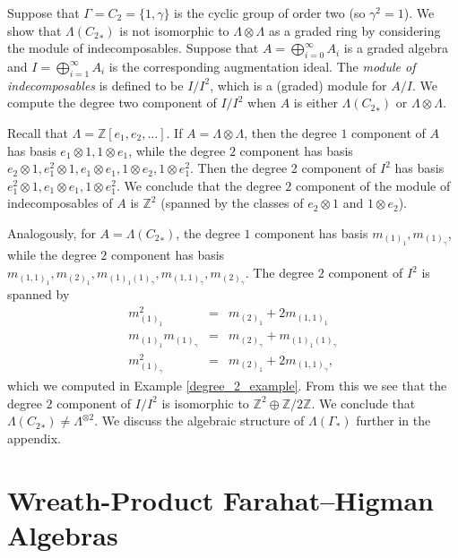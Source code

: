 \documentclass[ALCO,Unicode]{cedram}
\newcommand{\LambdaG}{\Lambda(\Gamma_*)}
\newcommand{\LambdaG}{\Lambda(\Gamma_*)}
\begin{document}
\begin{example}
Suppose that $\Gamma = C_2 = \{1, \gamma\}$ is the cyclic group of order two (so $\gamma^2=1$). We show that $\Lambda({C_2}_*)$ is not isomorphic to $\Lambda \otimes \Lambda$ as a graded ring by considering the module of indecomposables. Suppose that $A = \bigoplus_{i=0}^\infty A_i$ is a graded algebra and $I = \bigoplus_{i=1}^\infty A_i$ is the corresponding augmentation ideal. The \emph{module of indecomposables} is defined to be $I/I^2$, which is a (graded) module for $A/I$. We compute the degree two component of $I/I^2$ when $A$ is either $\Lambda({C_2}_*)$ or $\Lambda \otimes \Lambda$.

Recall that $\Lambda = \mathbb{Z}[e_1, e_2, \ldots]$. If $A = \Lambda \otimes \Lambda$, then the degree $1$ component of $A$ has basis $e_1 \otimes 1, 1 \otimes e_1$, while the degree $2$ component has basis $e_2 \otimes 1, e_1^2 \otimes 1, e_1 \otimes e_1, 1 \otimes e_2, 1 \otimes e_1^2$. Then the degree 2 component of $I^2$ has basis $e_1^2 \otimes 1, e_1 \otimes e_1, 1 \otimes e_1^2$. We conclude that the degree $2$ component of the module of indecomposables of $A$ is $\mathbb{Z}^2$ (spanned by the classes of $e_2 \otimes 1$ and $1 \otimes e_2$).

Analogously, for $A = \Lambda({C_2}_*)$, the degree $1$ component has basis $m_{(1)_1}, m_{(1)_\gamma}$, while the degree $2$ component has basis $m_{(1,1)_1}, m_{(2)_1}, m_{(1)_1 (1)_\gamma}, m_{(1,1)_\gamma}, m_{(2)_\gamma}$. The degree $2$ component of $I^2$ is spanned by 
\begin{eqnarray*}
m_{(1)_1}^2 &=& m_{(2)_1} + 2m_{(1,1)_1} \\
m_{(1)_1}m_{(1)_\gamma} &=&  m_{(2)_\gamma} + m_{(1)_1 (1)_\gamma} \\
m_{(1)_\gamma}^2 &=& m_{(2)_1} + 2 m_{(1,1)_\gamma},
\end{eqnarray*}
which we computed in Example \ref{degree_2_example}. From this we see that the degree $2$ component of $I/I^2$ is isomorphic to $\mathbb{Z}^{2} \oplus \mathbb{Z}/2\mathbb{Z}$. We conclude that $\Lambda({C_2}_*) \neq \Lambda^{\otimes 2}$. We discuss the algebraic structure of $\LambdaG$ further in the appendix.
\end{example}



\section{Wreath-Product Farahat--Higman Algebras} \label{rgamma_section}
\end{document}
